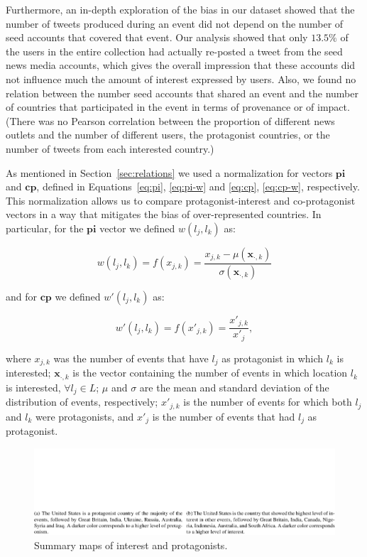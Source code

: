 
Furthermore, an in-depth exploration of the bias in our dataset showed that the
number of tweets produced during an event did not depend on the number of seed
accounts that covered that event. 
%
Our analysis showed that only $13.5\%$ of the users in the entire collection had
actually re-posted a tweet from the seed news media accounts, which gives the
overall impression that these accounts did not influence much the amount of
interest expressed by users. 
%
Also, we found no relation between the number seed accounts that shared an event
and the number of countries that participated in the event in terms of
provenance or of impact. 
%
(There was no Pearson correlation between the proportion of different news
outlets and the number of different users, the protagonist countries, or the
number of tweets from each interested country.)


As mentioned in Section~\ref{sec:relations} we used a normalization for vectors
$\mathbf{pi}$ and $\mathbf{cp}$, defined in Equations~\ref{eq:pi}, \ref{eq:pi-w}
and \ref{eq:cp}, \ref{eq:cp-w}, respectively. 
%
This normalization allows us to compare protagonist-interest and co-protagonist
vectors in a way that mitigates the bias of over-represented countries. 
%
In particular, for the $\mathbf{pi}$ vector we defined $w(l_j,l_k)$ as:

$$w(l_j, l_k) = f(x_{j,k})= \frac{x_{j,k} - \mu(\mathbf{x}_{\cdot,k})}{\sigma(\mathbf{x}_{\cdot,k})}$$

\noindent and for $\mathbf{cp}$ we defined $w'(l_j,l_k)$ as:

$$w'(l_j, l_k) = f(x'_{j,k})= \frac{x'_{j,k}}{x'_{j}},$$

\noindent where $x_{j,k}$ was the number of events that have $l_j$ as
protagonist in which $l_k$ is interested; $\mathbf{x}_{\cdot,k}$ is the vector
containing the number of events in which location $l_k$ is interested, $\forall
l_j \in L$; $\mu$ and $\sigma$ are the mean and standard deviation of the
distribution of events, respectively; $x'_{j,k}$ is the number of events for
which both $l_j$ and $l_k$ were protagonists, and $x'_{j}$ is the number of
events that had $l_j$ as protagonist.

\begin{figure}[t]
\centering
\includegraphics[width=\textwidth]{figures/geopolitical/choropleths.pdf}
\caption{Summary maps of interest and protagonists.}\label{fig:maps}
\end{figure}

